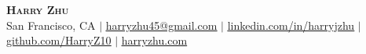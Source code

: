 \pagestyle{fancy}
\fancyhf{} %
\fancyfoot{}
\renewcommand{\headrulewidth}{0pt}
\renewcommand{\footrulewidth}{0pt}

\begin{center}
    \textbf{\Huge\scshape Harry Zhu} \\ \vspace{1pt}
    San Francisco, CA 
    $|$ \href{mailto:harryzhu45@gmail.com}{\underline{harryzhu45@gmail.com}}
    $|$ \href{https://linkedin.com/in/harryjzhu}{\underline{linkedin.com/in/harryjzhu}}
    $|$ \href{https://github.com/HarryZ10}{\underline{github.com/HarryZ10}}
    $|$ \href{https://harryzhu.com}{\underline{harryzhu.com}}
\end{center}
